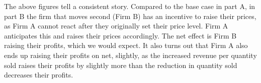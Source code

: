\documentclass[11pt]{article} %
\begin{document}
The above figures tell a consistent story. Compared to the base case in part A, in part B the firm that moves second (Firm B) has an incentive to raise their prices, as Firm A cannot react after they originally set their price level. Firm A anticipates this and raises their prices accordingly. The net effect is Firm B raising their profits, which we would expect. It also turns out that Firm A also ends up raising their profits on net, slightly, as the increased revenue per quantity sold raises their profits by slightly more than the reduction in quantity sold decreases their profits.
\end{document}
